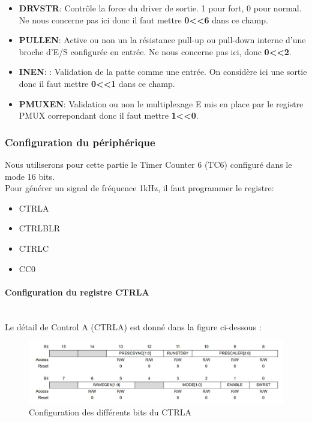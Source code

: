 \documentclass[a4paper]{article}
\begin{document}
	\begin{itemize}
		\item {\bf DRVSTR}: Contrôle la force du driver de sortie. 1 pour fort, 0 pour normal. Ne nous concerne pas ici donc il faut mettre {\bf 0\textless\textless6} dans ce champ.~~\\
		\item {\bf PULLEN}: Active ou non un la résistance pull-up ou pull-down interne d'une broche d'E/S configurée en entrée. Ne nous concerne pas ici, donc {\bf 0\textless\textless2}.~~\\
		\item {\bf INEN}: : Validation de la patte comme une entrée. On considère ici une sortie donc il faut mettre {\bf 0\textless\textless1} dans ce champ.~~\\
		\item {\bf PMUXEN}: Validation ou non le multiplexage E mis en place par le registre PMUX correpondant donc il faut mettre {\bf 1\textless\textless0}.~~\\
	\end{itemize}
	
	\subsubsection{Configuration du périphérique} 
	Nous utiliserons pour cette partie le Timer Counter 6 (TC6) configuré dans le mode 16 bits.\\
	Pour générer un signal de fréquence 1kHz, il faut programmer le registre:
	\begin{itemize}
		\item {CTRLA}
		\item {CTRLBLR}
		\item {CTRLC}
		\item {CC0}
	\end{itemize}
	\paragraph{Configuration du registre CTRLA} 
	~~\\
	Le détail de Control A (CTRLA) est donné dans la figure ci-dessous :
	\begin{figure}[H]
		\centering
		\includegraphics[width=0.9\linewidth]{ControlA.jpg}
		\caption{Configuration des différents bits du CTRLA}
	\end{figure}
	
\end{document}
